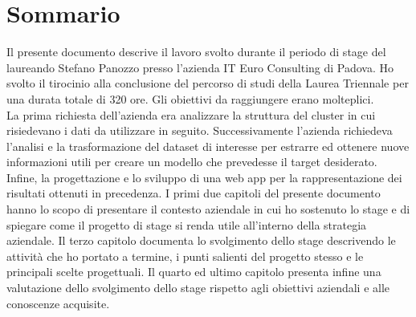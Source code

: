 
\cleardoublepage
{}
{}
\begingroup
\let\clearpage\relax
\let\cleardoublepage\relax
\let\cleardoublepage\relax

\chapter*{Sommario}

Il presente documento descrive il lavoro svolto durante il periodo di stage del laureando Stefano Panozzo presso l'azienda IT Euro Consulting di Padova. Ho svolto il tirocinio alla conclusione del percorso di studi della Laurea Triennale per una durata totale di 320 ore.
Gli obiettivi da raggiungere erano molteplici.\\
La prima richiesta dell'azienda era analizzare la struttura del \gls{cluster} in cui risiedevano i dati da utilizzare in seguito. 
Successivamente l'azienda richiedeva l'analisi e la trasformazione del dataset di interesse per estrarre ed ottenere nuove informazioni utili per creare un modello che prevedesse il target desiderato. 
Infine, la progettazione e lo sviluppo di una \gls{web app} per la rappresentazione dei risultati ottenuti in precedenza.
I primi due capitoli del presente documento hanno lo scopo di presentare il contesto aziendale in cui ho sostenuto lo stage e di spiegare come il progetto di stage si renda utile all'interno della strategia aziendale. Il terzo capitolo documenta lo svolgimento dello stage descrivendo le attività che ho portato a termine, i punti salienti del progetto stesso e le principali scelte progettuali. Il quarto ed ultimo capitolo presenta infine una valutazione dello svolgimento dello stage rispetto agli obiettivi aziendali e alle conoscenze acquisite.

%
%

\endgroup			

\vfill

